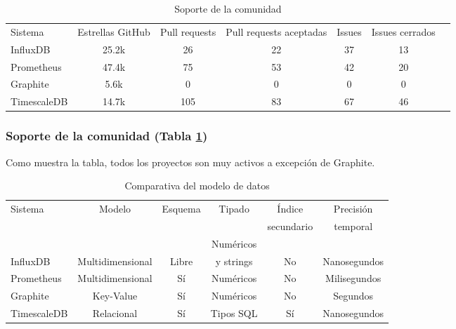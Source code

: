 \begin{table}[H]
    \begin{center}
        \begin{adjustbox}{max width=\textwidth}
            \begin{tabular}{l c c c c c c}
                \toprule
                Sistema & Estrellas GitHub & Pull requests & Pull requests aceptadas & Issues & Issues cerrados \\
                \otoprule
                InfluxDB    & 25.2k & 26 & 22 & 37 & 13 \\
                Prometheus  & 47.4k & 75 & 53 & 42 & 20\\
                Graphite & 5.6k & 0 & 0 & 0 & 0 \\
                TimescaleDB & 14.7k & 105 & 83 & 67 & 46 \\
                \bottomrule
            \end{tabular}
        \end{adjustbox}
        \caption{Soporte de la comunidad}
        \label{tabla:cssgbd}
    \end{center}
\end{table}

\subsubsection{Soporte de la comunidad (Tabla \ref{tabla:cssgbd})} Como muestra la tabla, todos los proyectos son muy
activos a excepción de Graphite.

\begin{table}[H]
    \begin{center}
        \begin{adjustbox}{max width=\textwidth}
            \begin{tabular}{l c c c c c}
                \toprule
                \multirow{2}{*}{Sistema} & \multirow{2}{*}{Modelo} & \multirow{2}{*}{Esquema} & \multirow{2}{*}{Tipado} & Índice & Precisión\\
                &&&& secundario & temporal \\
                \otoprule
                &&& Numéricos && \\
                \multirow{-2}{*}{InfluxDB}    & \multirow{-2}{*}{Multidimensional} & \multirow{-2}{*}{Libre} & y strings & \multirow{-2}{*}{No} & \multirow{-2}{*}{Nanosegundos} \\
                \rowcolor{gray!35}
                Prometheus  & Multidimensional & Sí & Numéricos & No & Milisegundos \\
                Graphite    & Key-Value & Sí & Numéricos & No & Segundos \\
                \rowcolor{gray!35}
                TimescaleDB & Relacional & Sí & Tipos SQL & Sí & Nanosegundos \\
                \bottomrule
            \end{tabular}
        \end{adjustbox}
        \caption{Comparativa del modelo de datos}
        \label{tabla:dmsgbd}
    \end{center}
\end{table}

